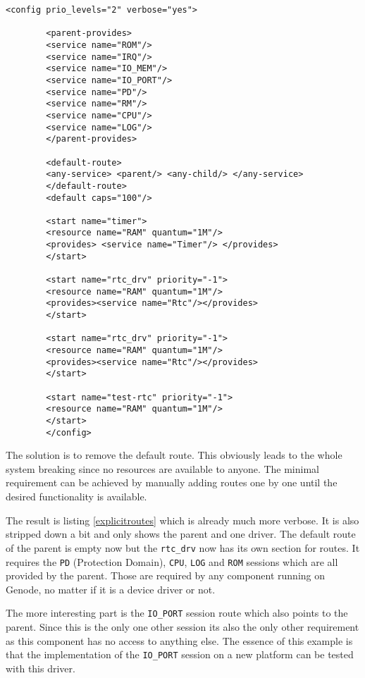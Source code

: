 \documentclass[
a4paper,
12pt,
notitlepage,
parskip=half,
DIV=11,
]{scrbook}
\begin{document}
		\begin{lstlisting}[basicstyle=\ttfamily\footnotesize]
		<config prio_levels="2" verbose="yes">
		
		<parent-provides>
		<service name="ROM"/>
		<service name="IRQ"/>
		<service name="IO_MEM"/>
		<service name="IO_PORT"/>
		<service name="PD"/>
		<service name="RM"/>
		<service name="CPU"/>
		<service name="LOG"/>
		</parent-provides>
		
		<default-route>
		<any-service> <parent/> <any-child/> </any-service>
		</default-route>
		<default caps="100"/>
		
		<start name="timer">
		<resource name="RAM" quantum="1M"/>
		<provides> <service name="Timer"/> </provides>
		</start>
		
		<start name="rtc_drv" priority="-1">
		<resource name="RAM" quantum="1M"/>
		<provides><service name="Rtc"/></provides>
		</start>
		
		<start name="rtc_drv" priority="-1">
		<resource name="RAM" quantum="1M"/>
		<provides><service name="Rtc"/></provides>
		</start>
		
		<start name="test-rtc" priority="-1">
		<resource name="RAM" quantum="1M"/>
		</start>
		</config>
		\end{lstlisting}
		
		The solution is to remove the default route.
		This obviously leads to the whole system breaking since no resources are available to anyone.
		The minimal requirement can be achieved by manually adding routes one by one until the desired functionality is available.
		
		The result is listing \ref{explicitroutes} which is already much more verbose.
		It is also stripped down a bit and only shows the parent and one driver.
		The default route of the parent is empty now but the \texttt{rtc\_drv} now has its own section for routes.
		It requires the \texttt{PD} (Protection Domain), \texttt{CPU}, \texttt{LOG} and \texttt{ROM} sessions which are all provided by the parent.
		Those are required by any component running on Genode, no matter if it is a device driver or not.
		
		The more interesting part is the \texttt{IO\_PORT} session route which also points to the parent.
		Since this is the only one other session its also the only other requirement as this component has no access to anything else.
		The essence of this example is that the implementation of the \texttt{IO\_PORT} session on a new platform can be tested with this driver.
		
\end{document}
